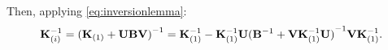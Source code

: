 \documentclass[a4paper]{vanvliet_paper}
\begin{document}
Then, applying \autoref{eq:inversionlemma}:
\begin{align}
    \mathbf{K}_{(i)}^{-1} = {(\mathbf{K}_{(1)} + \mathbf{U}\mathbf{B}\mathbf{V})}^{-1} =
    \mathbf{K}_{(1)}^{-1} - \mathbf{K}_{(1)}^{-1}\mathbf{U}{(\mathbf{B}^{-1} + \mathbf{V}\mathbf{K}_{(1)}^{-1}\mathbf{U})}^{-1}\mathbf{V}\mathbf{K}_{(1)}^{-1}.
\end{align}


\newpage
\printbibliography{}
\end{document}
